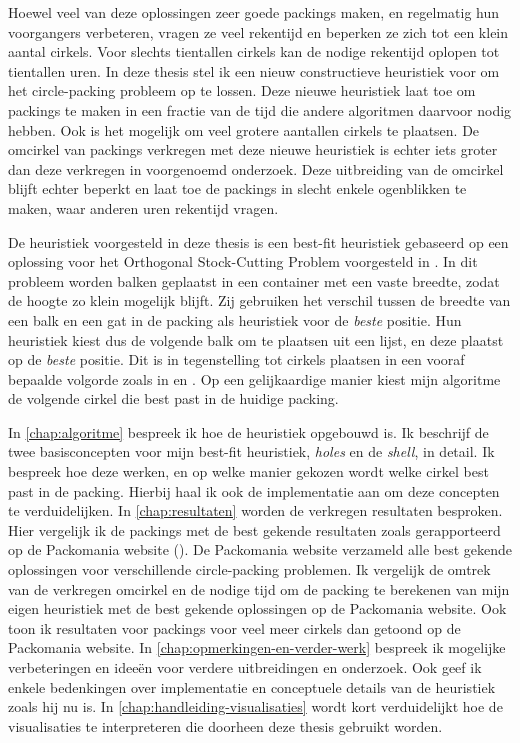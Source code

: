 \documentclass[12pt,a4paper,oneside]{book}
\begin{document}
Hoewel veel van deze oplossingen zeer goede packings maken, en regelmatig hun voorgangers verbeteren, vragen ze veel rekentijd en beperken ze zich tot een klein aantal cirkels.
Voor slechts tientallen cirkels kan de nodige rekentijd oplopen tot tientallen uren.
In deze thesis stel ik een nieuw constructieve heuristiek voor om het circle-packing probleem op te lossen.
Deze nieuwe heuristiek laat toe om packings te maken in een fractie van de tijd die andere algoritmen daarvoor nodig hebben.
Ook is het mogelijk om veel grotere aantallen cirkels te plaatsen.
De omcirkel van packings verkregen met deze nieuwe heuristiek is echter iets groter dan deze verkregen in voorgenoemd onderzoek.
Deze uitbreiding van de omcirkel blijft echter beperkt en laat toe de packings in slecht enkele ogenblikken te maken, waar anderen uren rekentijd vragen.

De heuristiek voorgesteld in deze thesis is een best-fit heuristiek gebaseerd op een oplossing voor het Orthogonal Stock-Cutting Problem voorgesteld in \cite{burke2004new}.
In dit probleem worden balken geplaatst in een container met een vaste breedte, zodat de hoogte zo klein mogelijk blijft.
Zij gebruiken het verschil tussen de breedte van een balk en een gat in de packing als heuristiek voor de \textit{beste} positie.
Hun heuristiek kiest dus de volgende balk om te plaatsen uit een lijst, en deze plaatst op de \textit{beste} positie.
Dit is in tegenstelling tot cirkels plaatsen in een vooraf bepaalde volgorde zoals in \cite{grosso2010} en \cite{jors2011}.
Op een gelijkaardige manier kiest mijn algoritme de volgende cirkel die best past in de huidige packing.

In \autoref{chap:algoritme} bespreek ik hoe de heuristiek opgebouwd is.
Ik beschrijf de twee basisconcepten voor mijn best-fit heuristiek, \textit{holes} en de \textit{shell}, in detail.
Ik bespreek hoe deze werken, en op welke manier gekozen wordt welke cirkel best past in de packing.
Hierbij haal ik ook de implementatie aan om deze concepten te verduidelijken.
In \autoref{chap:resultaten} worden de verkregen resultaten besproken.
Hier vergelijk ik de packings met de best gekende resultaten zoals gerapporteerd op de Packomania website (\cite{packomania}).
De Packomania website verzameld alle best gekende oplossingen voor verschillende circle-packing problemen.
Ik vergelijk de omtrek van de verkregen omcirkel en de nodige tijd om de packing te berekenen van mijn eigen heuristiek met de best gekende oplossingen op de Packomania website.
Ook toon ik resultaten voor packings voor veel meer cirkels dan getoond op de Packomania website.
In \autoref{chap:opmerkingen-en-verder-werk} bespreek ik mogelijke verbeteringen en ideeën voor verdere uitbreidingen en onderzoek.
Ook geef ik enkele bedenkingen over implementatie en conceptuele details van de heuristiek zoals hij nu is.
In \autoref{chap:handleiding-visualisaties} wordt kort verduidelijkt hoe de visualisaties te interpreteren die doorheen deze thesis gebruikt worden.
\end{document}
